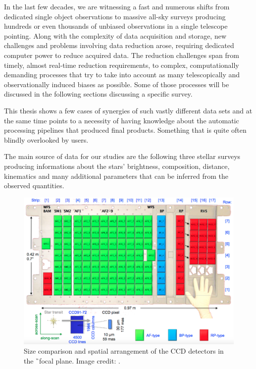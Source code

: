 In the last few decades, we are witnessing a fast and numerous shifts from dedicated single object observations to massive all-sky surveys producing hundreds or even thousands of unbiased observations in a single telescope pointing. Along with the complexity of data acquisition and storage, new challenges and problems involving data reduction arose, requiring dedicated computer power to reduce acquired data. The reduction challenges span from timely, almost real-time reduction requirements, to complex, computationally demanding processes that try to take into account as many telescopically and observationally induced biases as possible. Some of those processes will be discussed in the following sections discussing a specific survey.

This thesis shows a few cases of synergies of such vastly different data sets and at the same time points to a necessity of having knowledge about the automatic processing pipelines that produced final products. Something that is quite often blindly overlooked by users.

The main source of data for our studies are the following three stellar surveys producing informations about the stars' brightness, composition, distance, kinematics and many additional parameters that can be inferred from the observed quantities.

\begin{figure}
	\centering
	\includegraphics[width=\columnwidth]{gaia_ccd.png}
	\caption{Size comparison and spatial arrangement of the CCD detectors in the \G\ focal plane. Image credit: \citet{2016A&A...595A...1G}.}
	\label{fig:gaia_ccd}
\end{figure}

